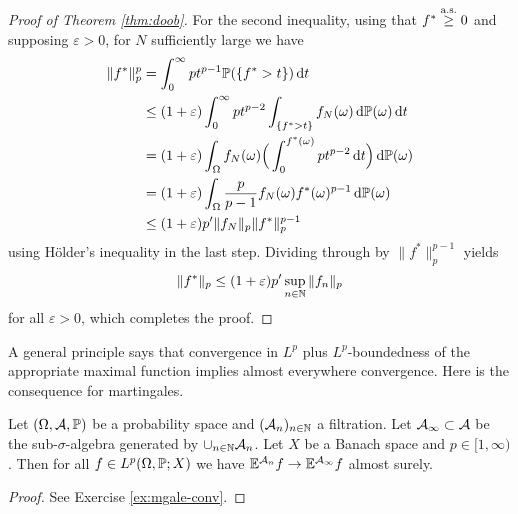 \begin{proof}[Proof of Theorem \ref{thm:doob}]
  For the second inequality, using that $f^* \stackrel{\as}{\geq} 0$ and supposing $\varepsilon > 0$, for $N$ sufficiently large we have
  \begin{equation*}
    \begin{aligned}
      \|f^*\|_{p}^{p}
      &= \int_0^\infty pt^{p-1} \P(\{f^* > t\}) \, \dd t \\
      &\leq (1 + \varepsilon) \int_0^\infty pt^{p-2} \int_{\{f^* > t\}} f_{N}(\omega) \, \dd\P(\omega) \, \dd t \\
      &= (1 + \varepsilon) \int_{\Omega} f_{N}(\omega) \Big( \int_0^{f^*(\omega)} pt^{p-2} \, \dd t \Big) \, \dd\P(\omega) \\
      &= (1 + \varepsilon) \int_{\Omega} \frac{p}{p-1} f_{N}(\omega) f^*(\omega)^{p-1} \, \dd\P(\omega) \\
      &\leq (1 + \varepsilon) p' \|f_{N}\|_{p} \|f^*\|_{p}^{p-1}
    \end{aligned}
  \end{equation*}
  using H\"older's inequality in the last step.
  Dividing through by $\|f^*\|_{p}^{p-1}$ yields
  \begin{equation*}
    \|f^*\|_{p} \leq (1 + \varepsilon) p' \sup_{n \in \N}\|f_{n}\|_{p}
  \end{equation*}
  for all $\varepsilon > 0$, which completes the proof.
\end{proof}


A general principle says that convergence in $L^p$ plus $L^p$-boundedness of the appropriate maximal function implies almost everywhere convergence.
Here is the consequence for martingales.

\begin{thm}\label{thm:mgale-pw-conv} 
  Let $(\Omega, \mc{A}, \P)$ be a probability space and $(\mc{A}_{n})_{n \in \N}$ a filtration.
  Let $\mc{A}_{\infty} \subset \mc{A}$ be the sub-$\sigma$-algebra generated by $\cup_{n \in \N} \mc{A}_{n}$.
  Let $X$ be a Banach space and $p \in [1,\infty)$.
  Then for all $f \in L^p(\Omega,\P;X)$ we have $\E^{\mc{A}_{n}} f \to \E^{\mc{A}_\infty} f$ almost surely.
\end{thm}

\begin{proof}
  See Exercise \ref{ex:mgale-conv}.
\end{proof}


